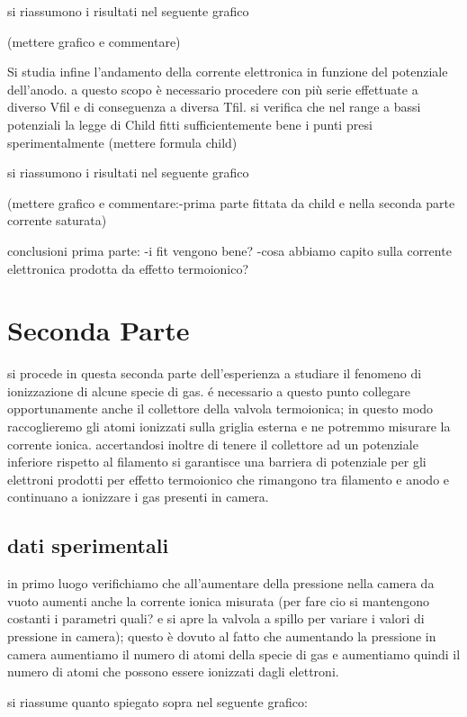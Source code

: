 \documentclass[11pt,a4paper]{article}
\begin{document}
si riassumono i risultati nel seguente grafico

(mettere grafico e commentare)

Si studia infine l'andamento della corrente elettronica in funzione del potenziale dell'anodo. a questo scopo è necessario procedere con più serie effettuate a diverso Vfil e di conseguenza a diversa Tfil.
si verifica che nel range a bassi potenziali la legge di Child fitti sufficientemente bene i punti presi sperimentalmente (mettere formula child)

si riassumono i risultati nel seguente grafico

(mettere grafico e commentare:-prima parte fittata da child e nella seconda parte corrente saturata)


conclusioni prima parte:
-i fit vengono bene?
-cosa abbiamo capito sulla corrente elettronica prodotta da effetto termoionico?



\section{Seconda Parte}
 
si procede in questa seconda parte dell'esperienza a studiare il fenomeno di ionizzazione di alcune specie di gas. é necessario a questo punto collegare opportunamente anche il collettore della valvola termoionica; in questo modo raccoglieremo gli atomi ionizzati sulla griglia esterna e ne potremmo misurare la corrente ionica. accertandosi inoltre di tenere il collettore ad un potenziale inferiore rispetto al filamento si garantisce una barriera di potenziale per gli elettroni prodotti per effetto termoionico che rimangono tra filamento e anodo e continuano a ionizzare i gas presenti in camera.

\subsection{dati sperimentali}

in primo luogo verifichiamo che all'aumentare della pressione nella camera da vuoto aumenti anche la corrente ionica misurata (per fare cio si mantengono costanti i parametri quali? e si apre la valvola a spillo per variare i valori di pressione in camera); questo è dovuto al fatto che aumentando la pressione in camera aumentiamo il numero di atomi della specie di gas e aumentiamo quindi il numero di atomi che possono essere ionizzati dagli elettroni.

si riassume quanto spiegato sopra nel seguente grafico:
\end{document}
